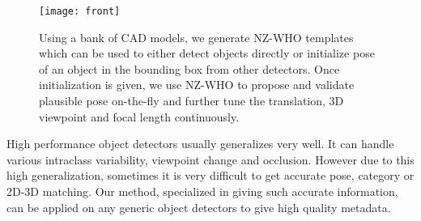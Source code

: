 \begin{figure}[t]
  \centering
  \texttt{[image: front]} %
  \caption{Using a bank of CAD models, we generate NZ-WHO templates which can be used to either detect objects directly or initialize pose of an object in the bounding box from other detectors. Once initialization is given, we use NZ-WHO to propose and validate plausible pose on-the-fly and further tune the translation, 3D viewpoint and focal length continuously.}
  \label{fig:front}
\end{figure}
 

High performance object detectors usually generalizes very well. It can handle various intraclass variability, viewpoint change and occlusion. However due to this high generalization, sometimes it is very difficult to get accurate pose, category or 2D-3D matching. Our method, specialized in giving such accurate information, can be applied on any generic object detectors to give high quality metadata.

